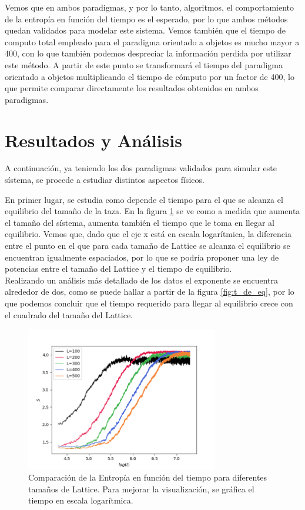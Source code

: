 \documentclass[12pt,twocolumn]{article}
\begin{document}
Vemos que en ambos paradigmas, y por lo tanto, algoritmos, el comportamiento de la entropía en función del tiempo es el esperado, por lo que ambos métodos quedan validados para modelar este sistema. Vemos también que el tiempo de computo total empleado para el paradigma orientado a objetos es mucho mayor a 400, con lo que también podemos despreciar la información perdida por utilizar este método. A partir de este punto se transformará el tiempo del paradigma orientado a objetos multiplicando el tiempo de cómputo por un factor de 400, lo que permite comparar directamente los resultados obtenidos en ambos paradigmas.

\section{Resultados y Análisis}

A continuación, ya teniendo los dos paradigmas validados para simular este sístema, se procede a estudiar distintos aspectos físicos.

En primer lugar, se estudia como depende el tiempo para el que se alcanza el equilibrio del tamaño de la taza. En la figura \ref{fig:S_vs_t_sizes} se ve como a medida que aumenta el tamaño del sístema, aumenta también el tiempo que le toma en llegar al equilibrio. Vemos que, dado que el eje x está en escala logarítmica, la diferencia entre el punto en el que para cada tamaño de Lattice se alcanza el equilibrio se encuentran igualmente espaciados, por lo que se podría proponer una ley de potencias entre el tamaño del Lattice y el tiempo de equilibrio.
\\

Realizando un análisis más detallado de los datos el exponente se encuentra alrededor de dos, como se puede hallar a partir de la figura \ref{fig:t_de_eq}, por lo que podemos concluir que el tiempo requerido para llegar al equilibrio crece con el cuadrado del tamaño del Lattice.
\\
\begin{figure}
    \centering
    \includegraphics[width=0.75\textwidth]{figs/S_vs_t_sizes.png}
    \caption{Comparación de la Entropía en función del tiempo para diferentes tamaños de Lattice. Para mejorar la visualización, se gráfica el tiempo en escala logarítmica.}
    \label{fig:S_vs_t_sizes}
\end{figure}
\end{document}
